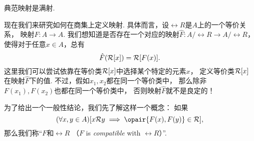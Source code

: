 \begin{proposition}\label{theorem:集合论.典范映射是满射}
典范映射是满射.
\end{proposition}

现在我们来研究如何在商集上定义映射.
具体而言，设\(\rel{R}\)是\(A\)上的一个等价关系，
映射\(F\colon A \to A\).
我们想知道是否存在一个对应的映射\(\hat{F}\colon A/\rel{R} \to A/\rel{R}\)，
使得对于任意\(x \in A\)，总有\begin{equation*}
	\hat{F}(\EquivalenceClassBH{x}[\rel{R}]) = \rel{R}[F(x)].
\end{equation*}
这里我们可以尝试依靠在等价类\(\EquivalenceClassBH{x}[\rel{R}]\)中选择某个特定的元素\(x\)，
定义等价类\(\EquivalenceClassBH{x}[\rel{R}]\)在映射\(\hat{F}\)下的值.
不过，假如\(x_1,x_2\)都在同一个等价类中，
那么除非\(F(x_1),F(x_2)\)也都在同一个等价类中，
否则映射\(\hat{F}\)就不是良定的！

为了给出一个一般性结论，我们先了解这样一个概念：
如果\begin{equation*}
	(\forall x,y \in A)
	[
		x \rel{R} y
		\implies
		\opair{F(x),F(y)} \in \rel{R}
	],
\end{equation*}
那么我们称“\(F\)和\(\rel{R}\) %
（\(F\) is \emph{compatible} with \(\rel{R}\)）”.

